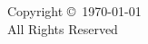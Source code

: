 \makeatletter
\null
\vfill
\thispagestyle{empty}
\vspace*{0in}
\begin{center}
  Copyright \copyright\ \yeardate\today\ \@author \\
  All Rights Reserved
\end{center}
\makeatother
\newpage
